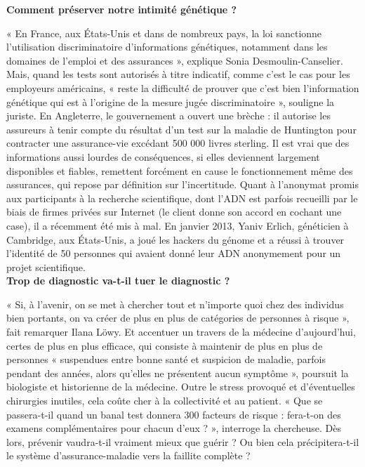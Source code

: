 \documentclass[8pt]{article}
\begin{document}
 
\textbf{Comment préserver notre intimité génétique ?}

« En France, aux États-Unis et dans de nombreux pays, la loi sanctionne l’utilisation discriminatoire d’informations génétiques, notamment dans les domaines de l’emploi et des assurances », explique Sonia Desmoulin-Canselier. Mais, quand les tests sont autorisés à titre indicatif, comme c’est le cas pour les employeurs américains, « reste la difficulté de prouver que c’est bien l’information génétique qui est à l’origine de la mesure jugée discriminatoire », souligne la juriste. En Angleterre, le gouvernement a ouvert une brèche : il autorise les assureurs à tenir compte du résultat d’un test sur la maladie de Huntington pour contracter une assurance-vie excédant 500 000 livres sterling. Il est vrai que des informations aussi lourdes de conséquences, si elles deviennent largement disponibles et fiables, remettent forcément en cause le fonctionnement même des assurances, qui repose par définition sur l’incertitude. Quant à l’anonymat promis aux participants à la recherche scientifique, dont l’ADN est parfois recueilli par le biais de firmes privées sur Internet (le client donne son accord en cochant une case), il a récemment été mis à mal. En janvier 2013, Yaniv Erlich, généticien à Cambridge, aux États-Unis, a joué les hackers du génome et a réussi à trouver l’identité de 50 personnes qui avaient donné leur ADN anonymement pour un projet scientifique.  \\
 

\textbf{Trop de diagnostic va-t-il tuer le diagnostic ?}

« Si, à l’avenir, on se met à chercher tout et n’importe quoi chez des individus bien portants, on va créer de plus en plus de catégories de personnes à risque », fait remarquer Ilana Löwy. Et accentuer un travers de la médecine d’aujourd’hui, certes de plus en plus efficace, qui consiste à maintenir de plus en plus de personnes « suspendues entre bonne santé et suspicion de maladie, parfois pendant des années, alors qu’elles ne présentent aucun symptôme », poursuit la biologiste et historienne de la médecine. Outre le stress provoqué et d’éventuelles chirurgies inutiles, cela coûte cher à la collectivité et au patient. « Que se passera-t-il quand un banal test donnera 300 facteurs de risque : fera-t-on des examens complémentaires pour chacun d’eux ? », interroge la chercheuse. Dès lors, prévenir vaudra-t-il vraiment mieux que guérir ? Ou bien cela précipitera-t-il le système d’assurance-maladie vers la faillite complète ? \\
\end{document}
